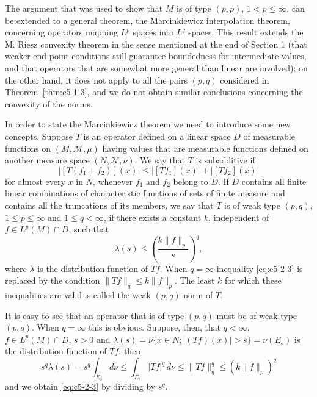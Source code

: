 The argument that was used to show that $M$ is of type $(p, p)$,
$1 < p \leq \infty$, can be extended to a general theorem, the Marcinkiewicz
interpolation theorem, concerning operators mapping $L^{p}$ spaces into $L^{q}$
spaces. This result extends the M. Riesz convexity theorem in the sense
mentioned at the end of Section 1 (that weaker end-point conditions still
guarantee boundedness for intermediate values, and that operators that are
somewhat more general than linear are involved); on the other hand, it does not
apply to all the pairs $(p, q)$ considered in Theorem~\ref{thm:c5-1-3}, and we
do not obtain similar conclusions concerning the convexity of the norms.

In order to state the Marcinkiewicz theorem we need to introduce some new
concepts. Suppose $T$ is an operator defined on a linear space $D$ of
measurable functions on $(M, \mathcal{M}, \mu)$ having values that are
measurable functions defined on another measure space $(N, \mathcal{N}, \nu)$.
We say that $T$ is subadditive if
\begin{equation}\label{eq:c5-2-2}
|[T(f_{1}+f_{2})](x)|\leq|[Tf_{1}](x)|+|[Tf_{2}](x)|
\end{equation}
for almost every $x$ in $N$, whenever $f_{1}$ and $f_{2}$ belong to $D$. If $D$
contains all finite linear combinations of characteristic functions of sets of
finite measure and contains all the truncations of its members, we say that $T$
is of weak type $(p, q)$, $1 \leq p \leq \infty$ and $1 \leq q < \infty$, if
there exists a constant $k$, independent of $f \in L^{p}(M) \cap D$, such that
\begin{equation}\label{eq:c5-2-3}
\lambda(s)\leq\left(\frac{k\|f\|_{p}}{s}\right)^{q},
\end{equation}
where $\lambda$ is the distribution function of $Tf$. When $q = \infty$
inequality \eqref{eq:c5-2-3} is replaced by the condition
$\|Tf\|_{q} \leq k\|f\|_{p}$. The least $k$ for which these inequalities are
valid is called the weak $(p, q)$ norm of $T$.

It is easy to see that an operator that is of type $(p, q)$ must be of weak
type $(p, q)$. When $q = \infty$ this is obvious. Suppose, then, that
$q < \infty$, $f \in L^{p}(M) \cap D$, $s > 0$ and
$\lambda(s) = \nu\{x \in N ; |(Tf)(x)| > s\} = \nu(E_{s})$ is the distribution
function of $Tf$; then
\[
s^{q}\lambda(s)=s^{q}\int_{E_{s}}d\nu\leq\int_{E_{s}}|Tf|^{q}\,d\nu
\leq\|Tf\|_{q}^{q}\leq(k\|f\|_{p})^{q}
\]
and we obtain \eqref{eq:c5-2-3} by dividing by $s^{q}$.

